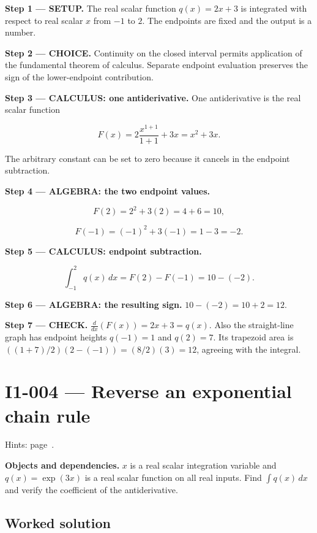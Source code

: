 \documentclass[11pt,oneside,openany]{book}
\begin{document}
\textbf{Step 1 --- SETUP.} The real scalar function \(q(x)=2x+3\) is integrated with respect
to real scalar \(x\) from \(-1\) to \(2\). The endpoints are fixed and the output is a number.

\begin{ChoiceStep}
\textbf{Step 2 --- CHOICE.} Continuity on the closed interval permits application of the
fundamental theorem of calculus. Separate endpoint evaluation preserves the
sign of the lower-endpoint contribution.

\end{ChoiceStep}
\textbf{Step 3 --- CALCULUS: one antiderivative.} One antiderivative is the real scalar function

\[
F(x)=2\frac{x^{1+1}}{1+1}+3x=x^2+3x.
\]

The arbitrary constant can be set to zero because it cancels in the endpoint subtraction.

\begingroup\color{AlgebraBlue}
\textbf{Step 4 --- ALGEBRA: the two endpoint values.}

\[
F(2)=2^2+3(2)=4+6=10,
\]

\[
F(-1)=(-1)^2+3(-1)=1-3=-2.
\]

\endgroup
\textbf{Step 5 --- CALCULUS: endpoint subtraction.}

\[
\int_{-1}^{2}q(x)\,dx=F(2)-F(-1)=10-(-2).
\]

\begingroup\color{AlgebraBlue}
\textbf{Step 6 --- ALGEBRA: the resulting sign.} \(10-(-2)=10+2=12\).

\endgroup
\textbf{Step 7 --- CHECK.} \(\frac{d}{dx}\left(F(x)\right)=2x+3=q(x)\).
Also the straight-line graph has endpoint heights \(q(-1)=1\) and \(q(2)=7\).
Its trapezoid area is \(((1+7)/2)(2-(-1))=(8/2)(3)=12\), agreeing with the integral.
\clearpage
\section{I1-004 --- Reverse an exponential chain rule}
\label{problem:I1-004}
{\small Hints: page~\pageref{hints:I1-004}.}\par\medskip

\textbf{Objects and dependencies.} \(x\) is a real scalar integration variable and
\(q(x)=\exp(3x)\) is a real scalar function on all real inputs. Find
\(\int q(x)\,dx\) and verify the coefficient of the antiderivative.
\subsection*{Worked solution}
\end{document}
